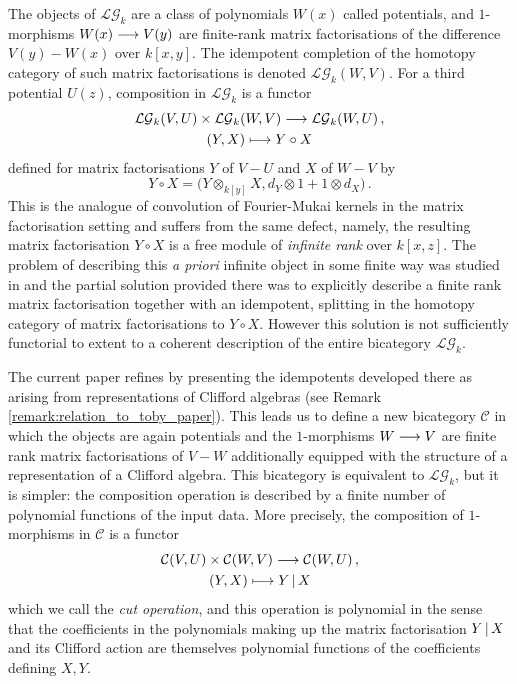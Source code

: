 \documentclass[english,letter paper,12pt,leqno]{article}
\theoremstyle{example}
\numberwithin{equation}{section}
\def\LG{\mathcal{LG}}
\def\be{\begin{equation}}
\def\ee{\end{equation}}
\def\L{\mathcal{C}}
\begin{document}
The objects of $\LG_k$ are a class of polynomials $W(x)$ called potentials, and $1$-morphisms $W(x) \longrightarrow V(y)$ are finite-rank matrix factorisations \cite{eisenbud} of the difference $V(y) - W(x)$ over $k[x,y]$. The idempotent completion of the homotopy category of such matrix factorisations is denoted $\LG_k(W,V)$. For a third potential $U(z)$, composition in $\LG_k$ is a functor
\begin{gather*}
\LG_k(V,U) \times \LG_k(W,V) \lto \LG_k(W,U)\,,\\
(Y , X) \longmapsto Y \circ X
\end{gather*}
defined for matrix factorisations $Y$ of $V - U$ and $X$ of $W - V$ by
\be
Y \circ X = \big( Y \otimes_{k[y]} X, d_Y \otimes 1 + 1 \otimes d_X \big)\,.
\ee
This is the analogue of convolution of Fourier-Mukai kernels in the matrix factorisation setting and suffers from the same defect, namely, the resulting matrix factorisation $Y \circ X$ is a free module of \emph{infinite rank} over $k[x,z]$. The problem of describing this \emph{a priori} infinite object in some finite way was studied in \cite{dm1102.2957} and the partial solution provided there was to explicitly describe a finite rank matrix factorisation together with an idempotent, splitting in the homotopy category of matrix factorisations to $Y \circ X$. However this solution is not sufficiently functorial to extent to a coherent description of the entire bicategory $\LG_k$.

The current paper refines \cite{dm1102.2957} by presenting the idempotents developed there as arising from representations of Clifford algebras (see Remark \ref{remark:relation_to_toby_paper}). This leads us to define a new bicategory $\L$ in which the objects are again potentials and the $1$-morphisms $W \longrightarrow V$ are finite rank matrix factorisations of $V - W$ additionally equipped with the structure of a representation of a Clifford algebra. This bicategory is equivalent to $\LG_k$, but it is simpler: the composition operation is described by a finite number of polynomial functions of the input data. More precisely, the composition of $1$-morphisms in $\L$ is a functor
\begin{gather}
\L(V,U) \times \L(W,V) \lto \L(W,U)\,,\label{eq:cut_functor_intro}\\
(Y,X) \longmapsto Y \l X
\end{gather}
which we call the \emph{cut operation}, and this operation is polynomial in the sense that the coefficients in the polynomials making up the matrix factorisation $Y \,|\, X$ and its Clifford action are themselves polynomial functions of the coefficients defining $X,Y$.
\end{document}
